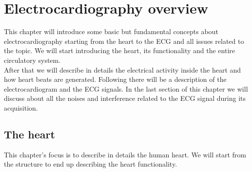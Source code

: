 
\chapter{Electrocardiography overview}
\label{Chapter2} 

This chapter will introduce some basic but fundamental concepts about electrocardiography starting from the heart to the ECG and all issues related to the topic. We will start introducing the heart, its functionality and the entire circulatory system.\\
After that we will describe in details the electrical activity inside the heart and how heart beats are generated. Following there will be a description of the electrocardiogram and the ECG signals. In the last section of this chapter we will discuss about all the noises and interference related to the ECG signal during its acquisition. 

\section{The heart}
\label{TheHeart}
This chapter’s focus is to describe in details the human heart. We will start from the structure to end up describing the heart functionality.

